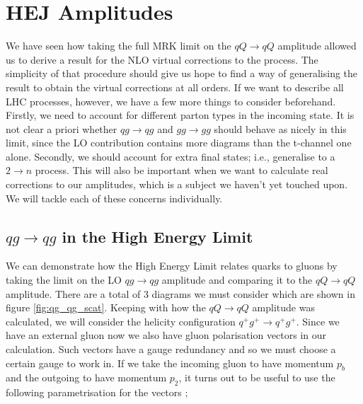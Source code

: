 
\section{HEJ Amplitudes}

We have seen how taking the full MRK limit on the $qQ \to qQ$ amplitude allowed us to derive a result for the NLO virtual corrections to the process. The simplicity of that procedure should give us hope to find a way of generalising the result to obtain the virtual corrections at all orders. If we want to describe all LHC processes, however, we have a few more things to consider beforehand. Firstly, we need to account for different parton types in the incoming state. It is not clear a priori whether $qg \to qg$ and $gg \to gg$ should behave as nicely in this limit, since the LO contribution contains more diagrams than the t-channel one alone. Secondly, we should account for extra final states; i.e., generalise to a $2 \to n$ process. This will also be important when we want to calculate real corrections to our amplitudes, which is a subject we haven't yet touched upon. We will tackle each of these concerns individually. 

\subsection{$qg \to qg$ in the High Energy Limit}
We can demonstrate how the High Energy Limit relates quarks to gluons by taking the limit on the LO $qg \to qg$ amplitude and comparing it to the $qQ \to qQ$ amplitude. There are a total of 3 diagrams we must consider which are shown in figure \ref{fig:qg_qg_scat}. Keeping with how the $qQ \to qQ$ amplitude was calculated, we will consider the helicity configuration $q^+ g^+ \to q^+ g^+$. Since we have an external gluon now we also have gluon polarisation vectors in our calculation. Such vectors have a gauge redundancy and so we must choose a certain gauge to work in. If we take the incoming gluon to have momentum $p_b$ and the outgoing to have momentum $p_2$, it turns out to be useful to use the following parametrisation for the vectors \cite{Dixon1996, Andersen2010};


